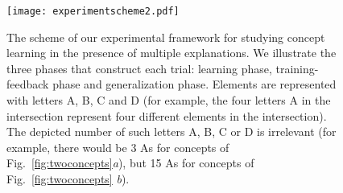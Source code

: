  \begin{figure}[t]
\begin{center}
	\texttt{[image: experimentscheme2.pdf]}
\end{center}\caption{\color{blue}The scheme of our experimental framework for studying concept learning in the presence of multiple explanations. We illustrate the three phases that construct each trial: learning phase, training-feedback phase and generalization phase. Elements are represented with letters {\sf A}, {\sf B}, {\sf C} and {\sf D} (for example, the four letters {\sf A} in the intersection represent four different elements in the intersection). The depicted number of such letters {\sf A}, {\sf B}, {\sf C} or {\sf D} is irrelevant (for example, there would be 3 {\sf A}s for concepts of Fig.\  \ref{fig:twoconcepts}{\em a}), but 15 {\sf A}s for concepts of Fig.\ \ref{fig:twoconcepts} {\em b}).  \color{black}}
\label{fig:trials}
\end{figure}%

